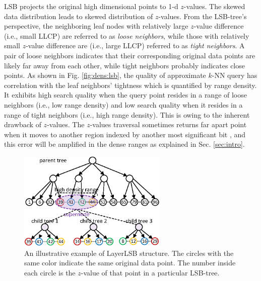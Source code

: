 LSB projects the original high dimensional points to 1-d $z$-values. The skewed data distribution leads to skewed distribution of $z$-values. From the LSB-tree's perspective, the neighboring leaf nodes with relatively large $z$-value difference (i.e., small LLCP) are referred to as \emph{loose neighbors}, while those with relatively small $z$-value difference are (i.e., large LLCP) referred to as \emph{tight neighbors}. A pair of loose neighbors indicates that their corresponding original data points are likely far away from each other, while tight neighbors probably indicates close points. As shown in Fig. \ref{fig:dens:lsb}, the quality of approximate $k$-NN query has correlation with the leaf neighbors' tightness which is quantified by range density. It exhibits high search quality when the query point resides in a range of loose neighbors (i.e., low range density) and low search quality when it resides in a range of tight neighbors (i.e., high range density). This is owing to the inherent drawback of $z$-values. The $z$-values traversal sometimes returns far apart point when it moves to another region indexed by another most significant bit \cite{zorkderknn,Zhang:2012:EPK:2247596.2247602}, and this error will be amplified in the dense ranges as explained in Sec. \ref{sec:intro}.


\begin{figure}[t]
    \centerline{\includegraphics[width=2.8in]{fig/layerlsb.eps}}
    \caption{An illustrative example of LayerLSB structure. The circles with the same color indicate the same original data point. The number inside each circle is the $z$-value of that point in a particular LSB-tree.}
    \label{fig:layerlsb}
\end{figure}

